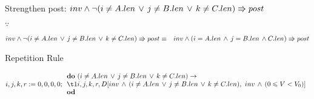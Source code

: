 \documentclass{article}
\begin{document}
\DERIVE
{} {Strengthen post: $inv \land \neg(i \neq A.len \,\lor\, j \neq B.len\,\lor\, k \neq C.len) \Rrightarrow post$}
\ENDDERIVE

$\because$

\begin{eqnarray*}
inv \land \neg(i \neq A.len\, \lor\, j \neq B.len\, \lor\, k \neq C.len) \Rrightarrow post & \equiv & inv \land (i = A.len\, \land\, j = B.len\, \land C.len) \Rrightarrow post
\end{eqnarray*}

\DERIVE
{} {Repetition Rule}
\ENDDERIVE

\[i, j, k, r := 0, 0, 0, 0;\\
\begin{array}{l}
\Do~ (i \neq A.len \,\lor\, j \neq B.len\,\lor\, k \neq C.len) \rightarrow\\
    \t1 i, j, k, r, D[inv\, \land\, (i \neq A.len \,\lor\, j \neq B.len\,\lor\, k \neq C.len),~ inv\, \land\, (0 \leqslant V < V_0)]\\
\Od\\
\end{array}\]






\end{document}
